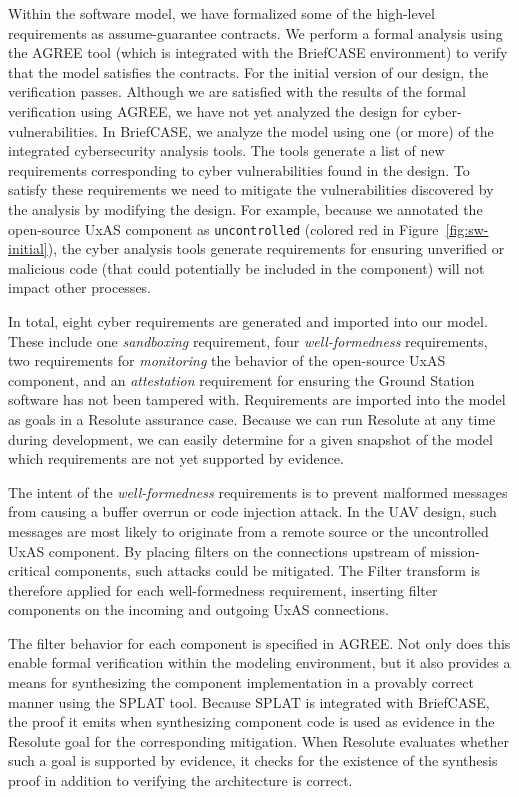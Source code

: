 Within the software model, we have formalized some of the high-level requirements as assume-guarantee contracts.  We perform a formal analysis using the AGREE tool (which is integrated with the BriefCASE environment) to verify that the model satisfies the contracts.  For the initial version of our design, the verification passes.
%
Although we are satisfied with the results of the formal verification using AGREE, we have not yet analyzed the design for cyber-vulnerabilities.  
In BriefCASE, we analyze the model using one (or more) of the integrated cybersecurity analysis tools.  The tools generate a list of new requirements corresponding to cyber vulnerabilities found in the design.  To satisfy these requirements we need to mitigate the vulnerabilities discovered by the analysis by modifying the design.
%
For example, because we annotated the open-source UxAS component as \texttt{uncontrolled} (colored red in Figure~\ref{fig:sw-initial}), the cyber analysis tools generate requirements for ensuring unverified or malicious code (that could potentially be included in the component) will not impact other processes. 

In total, eight cyber requirements are generated and imported into our model.  These include one \textit{sandboxing} requirement, four \textit{well-formedness} requirements, two requirements for \textit{monitoring} the behavior of the open-source UxAS component, and an \textit{attestation} requirement for ensuring the Ground Station software has not been tampered with.  Requirements are imported into the model as goals in a Resolute assurance case.  Because we can run Resolute at any time during development, we can easily determine for a given snapshot of the model which requirements are not yet supported by evidence.

The intent of the \textit{well-formedness} requirements is to prevent malformed messages from causing a buffer overrun or code injection attack.  In the UAV design, such messages are most likely to originate from a remote source or the uncontrolled UxAS component.  By placing filters on the connections upstream of mission-critical components, such attacks could be mitigated.  The Filter transform is therefore applied for each well-formedness requirement, inserting filter components on the incoming and outgoing UxAS connections.  

The filter behavior for each component is specified in AGREE.  Not only does this enable formal verification within the modeling environment, but it also provides a means for synthesizing the component implementation in a provably correct manner using the SPLAT tool.  Because SPLAT is integrated with BriefCASE, the proof it emits when synthesizing component code is used as evidence in the Resolute goal for the corresponding mitigation.  When Resolute evaluates whether such a goal is supported by evidence, it checks for the existence of the synthesis proof in addition to verifying the architecture is correct.  


